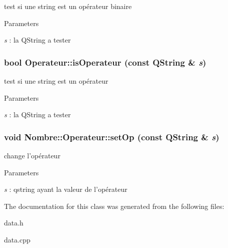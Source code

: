 test si une string est un opérateur binaire 


\begin{DoxyParams}{Parameters}
\item[{\em s}]: la QString a tester \end{DoxyParams}
\hypertarget{classNombre_1_1Operateur_aa245ad52a4b3adb3727750af78cc1ee3}{
\subsubsection[{isOperateur}]{\setlength{\rightskip}{0pt plus 5cm}bool Operateur::isOperateur (const QString \& {\em s})}}
\label{classNombre_1_1Operateur_aa245ad52a4b3adb3727750af78cc1ee3}


test si une string est un opérateur 


\begin{DoxyParams}{Parameters}
\item[{\em s}]: la QString a tester \end{DoxyParams}
\hypertarget{classNombre_1_1Operateur_a6dffb3f48b67f10ad0f4b629d35086ab}{
\subsubsection[{setOp}]{\setlength{\rightskip}{0pt plus 5cm}void Nombre::Operateur::setOp (const QString \& {\em s})}}
\label{classNombre_1_1Operateur_a6dffb3f48b67f10ad0f4b629d35086ab}


change l'opérateur 


\begin{DoxyParams}{Parameters}
\item[{\em s}]: qstring ayant la valeur de l'opérateur \end{DoxyParams}


The documentation for this class was generated from the following files:\begin{DoxyCompactItemize}
\item 
data.h\item 
data.cpp\end{DoxyCompactItemize}
